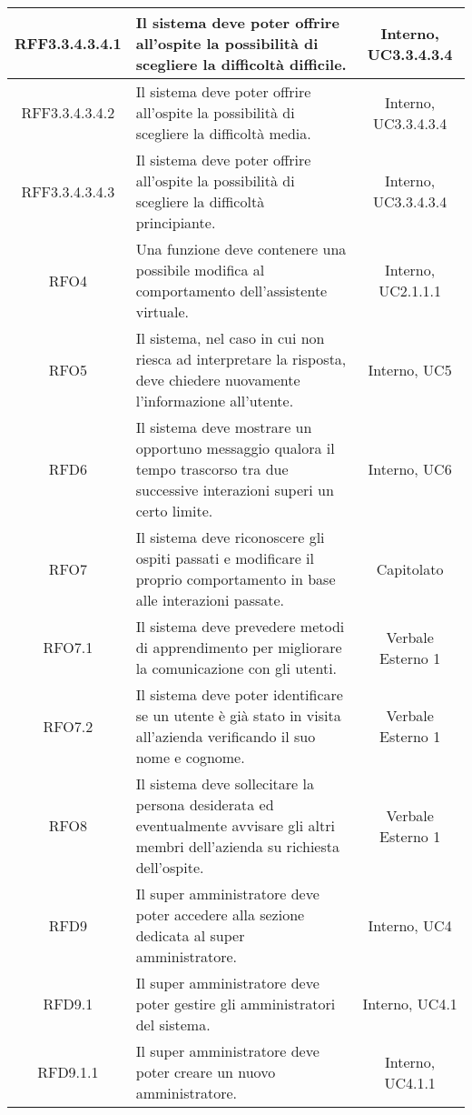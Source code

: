 \begin{longtable}{|c|>{\centering}m{7cm}|c|}
\hypertarget{RFF3.3.4.3.4.1}{RFF3.3.4.3.4.1} & Il sistema deve poter offrire all'ospite la possibilità di scegliere la difficoltà difficile. & Interno, UC3.3.4.3.4\\ \hline
\hypertarget{RFF3.3.4.3.4.2}{RFF3.3.4.3.4.2} & Il sistema deve poter offrire all'ospite la possibilità di scegliere la difficoltà media. & Interno, UC3.3.4.3.4\\ \hline
\hypertarget{RFF3.3.4.3.4.3}{RFF3.3.4.3.4.3} & Il sistema deve poter offrire all'ospite la possibilità di scegliere la difficoltà principiante. & Interno, UC3.3.4.3.4\\ \hline
\hypertarget{RFO4}{RFO4} & Una funzione deve contenere una possibile modifica al comportamento dell'assistente virtuale. & Interno, UC2.1.1.1\\ \hline
\hypertarget{RFO5}{RFO5} & Il sistema, nel caso in cui non riesca ad interpretare la risposta, deve chiedere nuovamente l'informazione all'utente. & Interno, UC5\\ \hline
\hypertarget{RFD6}{RFD6} & Il sistema deve mostrare un opportuno messaggio qualora il tempo trascorso tra due successive interazioni superi un certo limite. & Interno, UC6\\ \hline
\hypertarget{RFO7}{RFO7} & Il sistema deve riconoscere gli ospiti passati e modificare il proprio comportamento in base alle interazioni passate. & Capitolato\\ \hline
\hypertarget{RFO7.1}{RFO7.1} & Il sistema deve prevedere metodi di apprendimento per migliorare la comunicazione con gli utenti. & Verbale Esterno 1\\ \hline
\hypertarget{RFO7.2}{RFO7.2} & Il sistema deve poter identificare se un utente è già stato in visita all'azienda verificando il suo nome e cognome. & Verbale Esterno 1\\ \hline
\hypertarget{RFO8}{RFO8} & Il sistema deve sollecitare la persona desiderata ed eventualmente avvisare gli altri membri dell'azienda su richiesta dell'ospite. & Verbale Esterno 1\\ \hline
\hypertarget{RFD9}{RFD9} & Il super amministratore deve poter accedere alla sezione dedicata al super amministratore. & Interno, UC4\\ \hline
\hypertarget{RFD9.1}{RFD9.1} & Il super amministratore deve poter gestire gli amministratori del sistema. & Interno, UC4.1\\ \hline
\hypertarget{RFD9.1.1}{RFD9.1.1} & Il super amministratore deve poter creare un nuovo amministratore. & Interno, UC4.1.1\\ \hline

\end{longtable}
